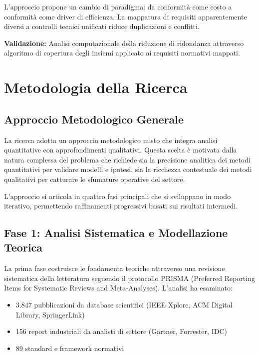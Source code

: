 L'approccio propone un cambio di paradigma: da conformità come costo a conformità come driver di efficienza. La mappatura di requisiti apparentemente diversi a controlli tecnici unificati riduce duplicazioni e conflitti.

\textbf{Validazione:} Analisi computazionale della riduzione di ridondanza attraverso algoritmo di copertura degli insiemi applicato ai requisiti normativi mappati.

\section{\texorpdfstring{Metodologia della Ricerca}{1.5 - Metodologia della Ricerca}}
\label{sec:metodologia}

\subsection{\texorpdfstring{Approccio Metodologico Generale}{1.5.1 - Approccio Metodologico Generale}}
\label{subsec:approccio_metodologico}

La ricerca adotta un approccio metodologico misto che integra analisi quantitative con approfondimenti qualitativi. Questa scelta è motivata dalla natura complessa del problema che richiede sia la precisione analitica dei metodi quantitativi per validare modelli e ipotesi, sia la ricchezza contestuale dei metodi qualitativi per catturare le sfumature operative del settore.

L'approccio si articola in quattro fasi principali che si sviluppano in modo iterativo, permettendo raffinamenti progressivi basati sui risultati intermedi.

\subsection{\texorpdfstring{Fase 1: Analisi Sistematica e Modellazione Teorica}{1.5.2 - Fase 1: Analisi Sistematica e Modellazione Teorica}}
\label{subsec:fase1}

La prima fase costruisce le fondamenta teoriche attraverso una revisione sistematica della letteratura seguendo il protocollo PRISMA (Preferred Reporting Items for Systematic Reviews and Meta-Analyses). L'analisi ha esaminato:
\begin{itemize}
\item 3.847 pubblicazioni da database scientifici (IEEE Xplore, ACM Digital Library, SpringerLink)
\item 156 report industriali da analisti di settore (Gartner, Forrester, IDC)
\item 89 standard e framework normativi
\end{itemize}

